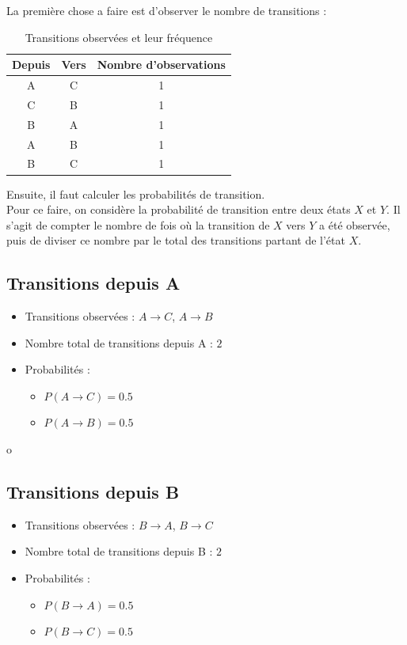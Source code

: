 \documentclass[a4paper, 11pt]{report}
\begin{document}
\noindent{}La première chose a faire est d'observer le nombre de transitions :
\begin{table}[h!]
	\centering
	\begin{tabular}{|c|c|c|}
		\hline
		\textbf{Depuis} & \textbf{Vers} & \textbf{Nombre d'observations} \\
		\hline
		A               & C             & 1                              \\
		C               & B             & 1                              \\
		B               & A             & 1                              \\
		A               & B             & 1                              \\
		B               & C             & 1                              \\
		\hline
	\end{tabular}
	\caption{Transitions observées et leur fréquence}
\end{table}

Ensuite, il faut calculer les probabilités de transition. \\
Pour ce faire, on considère la probabilité de transition entre deux états \(X\) et \(Y\). Il s'agit de compter le nombre de fois où la transition de \(X\) vers \(Y\) a été observée, puis de diviser ce nombre par le total des transitions partant de l'état \(X\).

\subsection*{Transitions depuis A}
\begin{itemize}
	\item Transitions observées : \( A \rightarrow C \), \( A \rightarrow B \)
	\item Nombre total de transitions depuis A : \(2\)
	\item Probabilités :
	      \begin{itemize}
		      \item \( P(A \rightarrow C)  = 0.5 \)
		      \item \( P(A \rightarrow B)  = 0.5 \)
	      \end{itemize}
\end{itemize}o

\subsection*{Transitions depuis B}
\begin{itemize}
	\item Transitions observées : \( B \rightarrow A \), \( B \rightarrow C \)
	\item Nombre total de transitions depuis B : \(2\)
	\item Probabilités :
	      \begin{itemize}
		      \item \( P(B \rightarrow A) = 0.5 \)
		      \item \( P(B \rightarrow C) = 0.5 \)
	      \end{itemize}
\end{itemize}
\end{document}
